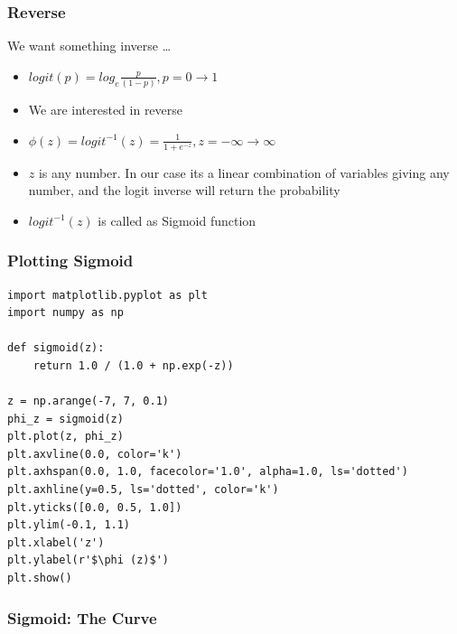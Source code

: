 \begin{frame}[fragile]\frametitle{Reverse}
We want something inverse \ldots
 \begin{itemize}
\item $logit(p) = log_e \frac{p}{(1-p)}, p = 0 \rightarrow 1$
\item We are interested in reverse

\item $\phi(z) = logit^{-1}(z) = \frac{1}{1+ e^{-z}}, z = -\infty \rightarrow \infty$
\item $z$ is any number. In our case its a linear combination of variables giving any number, and the logit inverse will return the probability
\item $logit^{-1}(z)$ is called as Sigmoid function
\end{itemize}
\end{frame}

\begin{frame}[fragile]\frametitle{Plotting Sigmoid}
 \begin{lstlisting}
import matplotlib.pyplot as plt
import numpy as np

def sigmoid(z):
	return 1.0 / (1.0 + np.exp(-z))
	
z = np.arange(-7, 7, 0.1)
phi_z = sigmoid(z)
plt.plot(z, phi_z)
plt.axvline(0.0, color='k')
plt.axhspan(0.0, 1.0, facecolor='1.0', alpha=1.0, ls='dotted')
plt.axhline(y=0.5, ls='dotted', color='k')
plt.yticks([0.0, 0.5, 1.0])
plt.ylim(-0.1, 1.1)
plt.xlabel('z')
plt.ylabel(r'$\phi (z)$')
plt.show() 
\end{lstlisting}
\end{frame}

\begin{frame}[fragile]\frametitle{Sigmoid: The Curve}
\begin{center}
\end{center}
\end{frame}

